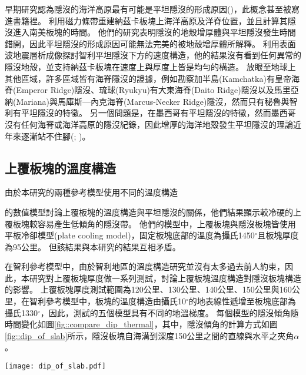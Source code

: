 早期研究認為隱沒的海洋高原最有可能是平坦隱沒的形成原因(\citealp{gutscher2002andean})，此概念甚至被寫進書籍裡。
\citealp{Skinner2013}利用磁力條帶重建納茲卡板塊上海洋高原及洋脊位置，並且計算其隱沒進入南美板塊的時間。
他們的研究表明隱沒的地殼增厚體與平坦隱沒發生時間錯開，因此平坦隱沒的形成原因可能無法完美的被地殼增厚體所解釋。
\citealp{Marot2014}利用表面波地震層析成像探討智利平坦隱沒下方的速度構造，他的結果沒有看到任何異常的隱沒地殼，並支持納茲卡板塊在速度上與厚度上皆是均勻的構造。
放眼至地球上其他區域，許多區域皆有海脊隱沒的證據，例如勘察加半島(Kamchatka)有皇帝海脊(Emperor Ridge)隱沒、琉球(Ryukyu)有大東海脊(Daito Ridge)隱沒以及馬里亞納(Mariana)與馬庫斯—內克海脊(Marcus-Necker Ridge)隱沒，然而只有秘魯與智利有平坦隱沒的特徵。
另一個問題是，在墨西哥有平坦隱沒的特徵，然而墨西哥沒有任何海脊或海洋高原的隱沒紀錄，因此增厚的海洋地殼發生平坦隱沒的理論近年來逐漸站不住腳(\citealp{schellart2020control}; \citealp{Schellart2021})。



\subsection{上覆板塊的溫度構造}

由於本研究的兩種參考模型使用不同的溫度構造

\citealp{Thermal2012}的數值模型討論上覆板塊的溫度構造與平坦隱沒的關係，他們結果顯示較冷硬的上覆板塊較容易產生低傾角的隱沒帶。
他們的模型中，上覆板塊與隱沒板塊皆使用平板冷卻模型(plate cooling model)，固定板塊底部的溫度為攝氏1450$^\circ$且板塊厚度為95公里。
但該結果與本研究的結果互相矛盾。

在智利參考模型中，由於智利地區的溫度構造研究並沒有太多過去前人約束，因此，本研究對上覆板塊厚度做一系列測試，討論上覆板塊溫度構造對隱沒板塊構造的影響。
上覆板塊厚度測試範圍為120公里、130公里、140公里、150公里與160公里，在智利參考模型中，板塊的溫度構造由攝氏10$^\circ$的地表線性遞增至板塊底部為攝氏1330$^\circ$，因此，測試的五個模型具有不同的地溫梯度。
每個模型的隱沒傾角隨時間變化如圖\ref{fig::compare_dip_thermal}，其中，隱沒傾角的計算方式如圖\ref{fig::dip_of_slab}所示，隱沒板塊自海溝到深度150公里之間的直線與水平之夾角$\alpha$。

\begin{figure*}[h]
    \centering
    \texttt{[image: dip\_of\_slab.pdf]}
    \caption[本研究中隱沒傾角的計算方式]{本研究中隱沒傾角的計算方式。}
    \label{fig::dip_of_slab}
\end{figure*}

